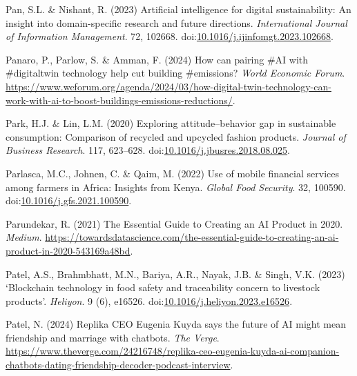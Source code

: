 \documentclass[
  letterpaper,
  DIV=11,
  numbers=noendperiod]{scrartcl}
\newlength{\cslhangindent}
\newenvironment{CSLReferences}[2] %
 {\begin{list}{}{%
  \setlength{\itemindent}{0pt}
  \setlength{\leftmargin}{0pt}
  \setlength{\parsep}{0pt}
  \ifodd #1
   \setlength{\leftmargin}{\cslhangindent}
   \setlength{\itemindent}{-1\cslhangindent}
  \fi
  \setlength{\itemsep}{#2\baselineskip}}}
 {\end{list}}
\begin{document}
\begin{CSLReferences}{0}{1}
Pan, S.L. \& Nishant, R. (2023) Artificial intelligence for digital
sustainability: {An} insight into domain-specific research and future
directions. \emph{International Journal of Information Management}. 72,
102668.
doi:\href{https://doi.org/10.1016/j.ijinfomgt.2023.102668}{10.1016/j.ijinfomgt.2023.102668}.

Panaro, P., Parlow, S. \& Amman, F. (2024) How can pairing \#{AI} with
\#digitaltwin technology help cut building \#emissions? \emph{World
Economic Forum}.
\url{https://www.weforum.org/agenda/2024/03/how-digital-twin-technology-can-work-with-ai-to-boost-buildings-emissions-reductions/}.

Park, H.J. \& Lin, L.M. (2020) Exploring attitude--behavior gap in
sustainable consumption: Comparison of recycled and upcycled fashion
products. \emph{Journal of Business Research}. 117, 623--628.
doi:\href{https://doi.org/10.1016/j.jbusres.2018.08.025}{10.1016/j.jbusres.2018.08.025}.

Parlasca, M.C., Johnen, C. \& Qaim, M. (2022) Use of mobile financial
services among farmers in {Africa}: {Insights} from {Kenya}.
\emph{Global Food Security}. 32, 100590.
doi:\href{https://doi.org/10.1016/j.gfs.2021.100590}{10.1016/j.gfs.2021.100590}.

Parundekar, R. (2021) The {Essential Guide} to {Creating} an {AI
Product} in 2020. \emph{Medium}.
\url{https://towardsdatascience.com/the-essential-guide-to-creating-an-ai-product-in-2020-543169a48bd}.

Patel, A.S., Brahmbhatt, M.N., Bariya, A.R., Nayak, J.B. \& Singh, V.K.
(2023) {`{Blockchain} technology in food safety and traceability concern
to livestock products'}. \emph{Heliyon}. 9 (6), e16526.
doi:\href{https://doi.org/10.1016/j.heliyon.2023.e16526}{10.1016/j.heliyon.2023.e16526}.

Patel, N. (2024) Replika {CEO Eugenia Kuyda} says the future of {AI}
might mean friendship and marriage with chatbots. \emph{The Verge}.
\url{https://www.theverge.com/24216748/replika-ceo-eugenia-kuyda-ai-companion-chatbots-dating-friendship-decoder-podcast-interview}.


\end{CSLReferences}
\end{document}
